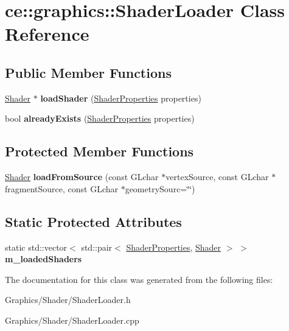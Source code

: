 \hypertarget{classce_1_1graphics_1_1_shader_loader}{}\section{ce\+:\+:graphics\+:\+:Shader\+Loader Class Reference}
\label{classce_1_1graphics_1_1_shader_loader}
\subsection*{Public Member Functions}
\begin{DoxyCompactItemize}
\item 
\mbox{\label{classce_1_1graphics_1_1_shader_loader_a18279dc40df8efffce0b3d5227bd6af1}} 
\hyperlink{classce_1_1graphics_1_1_shader}{Shader} $\ast$ {\bfseries load\+Shader} (\hyperlink{structce_1_1graphics_1_1_shader_properties}{Shader\+Properties} properties)
\item 
\mbox{\label{classce_1_1graphics_1_1_shader_loader_ae01c71a34d77e36b5aafc142214c6595}} 
bool {\bfseries already\+Exists} (\hyperlink{structce_1_1graphics_1_1_shader_properties}{Shader\+Properties} properties)
\end{DoxyCompactItemize}
\subsection*{Protected Member Functions}
\begin{DoxyCompactItemize}
\item 
\mbox{\label{classce_1_1graphics_1_1_shader_loader_a367c0b92dc1f1aa2470952a20db102d4}} 
\hyperlink{classce_1_1graphics_1_1_shader}{Shader} {\bfseries load\+From\+Source} (const G\+Lchar $\ast$vertex\+Source, const G\+Lchar $\ast$fragment\+Source, const G\+Lchar $\ast$geometry\+Sourc=\char`\"{}\char`\"{})
\end{DoxyCompactItemize}
\subsection*{Static Protected Attributes}
\begin{DoxyCompactItemize}
\item 
\mbox{\label{classce_1_1graphics_1_1_shader_loader_a4b5b3bfb9613bc3b4daeb1ffaa798e92}} 
static std\+::vector$<$ std\+::pair$<$ \hyperlink{structce_1_1graphics_1_1_shader_properties}{Shader\+Properties}, \hyperlink{classce_1_1graphics_1_1_shader}{Shader} $>$ $>$ {\bfseries m\+\_\+loaded\+Shaders}
\end{DoxyCompactItemize}


The documentation for this class was generated from the following files\+:\begin{DoxyCompactItemize}
\item 
Graphics/\+Shader/Shader\+Loader.\+h\item 
Graphics/\+Shader/Shader\+Loader.\+cpp\end{DoxyCompactItemize}
